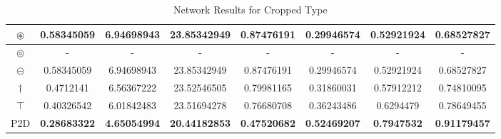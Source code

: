 \begin{table}[!h]
{\begin{tabular}{|c|c|c|c|c|c|c|c|}
			$\circledast$        & 0.58345059 & 6.94698943  & 23.85342949 & 0.87476191 & 0.29946574      & 0.52921924        & 0.68527827        \\ \hline
			$\circledcirc$       & -          & -           & -           & -          & -               & -                 & -                 \\ \hline
			$\circleddash$       & 0.58345059 & 6.94698943  & 23.85342949 & 0.87476191 & 0.29946574      & 0.52921924        & 0.68527827        \\ \hline
			$\dagger$            & 0.4712141  & 6.56367222  & 23.52546505 & 0.79981165 & 0.31860031      & 0.57912212        & 0.74810095        \\ \hline
			$\intercal$          & 0.40326542 & 6.01842483  & 23.51694278 & 0.76680708 & 0.36243486      & 0.6294479         & 0.78649455        \\ \hline
			P2D & \textbf{0.28683322} & \textbf{4.65054994} &\textbf{ 20.44182853} & \textbf{0.47520682} & \textbf{0.52469207} & \textbf{0.7947532} & \textbf{0.91179457} \\ \hline
		\end{tabular}%
	}
	\caption{Network Results for Cropped Type}
	\label{tab:my-table4}
\end{table}



